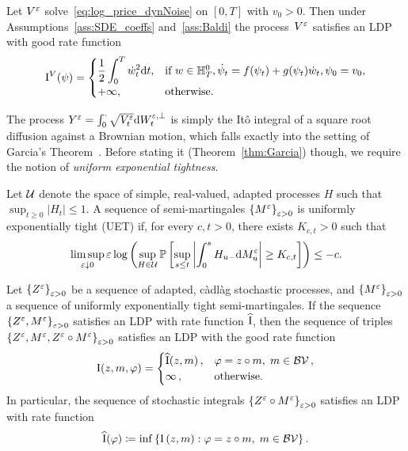 \begin{theorem}
\label{thm:Baldi}
Let $V^{\varepsilon}$ solve~\eqref{eq:log_price_dynNoise} on $[0, T]$ with $v_0>0$. Then under Assumptions~\ref{ass:SDE_coeffs} and~\ref{ass:Baldi} the process~$V^\varepsilon$ satisfies an LDP with good rate function
\[
\mathrm{I}^{V}(\psi)= \begin{cases}
\displaystyle \frac{1}{2} \int_{0}^{T} \dot{w}_t^2 \mathrm{d} t, 
& \text{if } w\in\mathbb{H}^0_T, \dot{\psi}_t = f(\psi_t) + g(\psi_t)\dot{w}_t, \psi_0 = v_0, \\ 
+\infty, & \text{otherwise}.
\end{cases}
\]
\end{theorem}
The process $Y^\varepsilon=\int_0^\cdot \sqrt{V^\varepsilon_{t}} \mathrm{d} W^{\varepsilon,\perp}_{t}$ is simply the It{\^o} integral of a square root diffusion against a Brownian motion, which falls exactly into the setting of Garcia's Theorem~\cite{Garcia2007AIntegrals}. 
Before stating it (Theorem~\ref{thm:Garcia}) though, 
we require the notion of \textit{uniform exponential tightness}.
\begin{definition}\label{def:UET}
Let $\mathcal{U}$ denote the space of simple, real-valued, adapted processes $H$ such that $\sup _{t \geq 0}\left|H_{t}\right| \leq 1$. A sequence of semi-martingales $\left\{M^{\varepsilon}\right\}_{\varepsilon > 0}$ is uniformly exponentially tight (UET) if, for every $c, t>0$, there exists $K_{c, t}>0$ such that
\[
\limsup _{\varepsilon \downarrow 0} \varepsilon \log \left(\sup _{H \in \mathcal{U}} \mathbb{P}\left[\sup _{s \leq t}\left|\int_{0}^{s} H_{u-} \mathrm{d} M_{u}^{\varepsilon}\right| \geq K_{c, t}\right]\right) \leq-c .
\]
\end{definition}
\begin{theorem}\label{thm:Garcia}
Let $\left\{Z^{\varepsilon}\right\}_{\varepsilon > 0}$ be a sequence of adapted, c\`adl\`ag stochastic processes, and $\left\{M^{\varepsilon}\right\}_{\varepsilon > 0}$ a sequence of uniformly exponentially tight semi-martingales. If the sequence $\left\{Z^{\varepsilon}, M^{\varepsilon}\right\}_{\varepsilon > 0} $ satisfies an LDP with rate function $\widehat{\mathrm{I}}$, then the sequence of triples $\left\{Z^{\varepsilon}, M^{\varepsilon}, Z^\varepsilon\circ M^\varepsilon\right\}_{\varepsilon > 0} $ satisfies an LDP with the good rate function
\[
\mathrm{I}(z,m,\varphi)=\begin{cases}
\widehat{\mathrm{I}}(z,m)\,, & \varphi = z \circ m,\; m \in \mathcal{BV}\,, \\
\infty\,, & \text{otherwise}.
\end{cases}
\]
In particular, the sequence of stochastic integrals $\left\{Z^{\varepsilon} \circ M^{\varepsilon}\right\}_{\varepsilon > 0}$ satisfies an LDP with rate function $$\widehat{\mathrm{I}}(\varphi)\coloneqq\inf \left\{\mathrm{I}\left(z,m\right): \varphi=z \circ m,\; m \in \mathcal{BV}\right\}.$$
\end{theorem}
